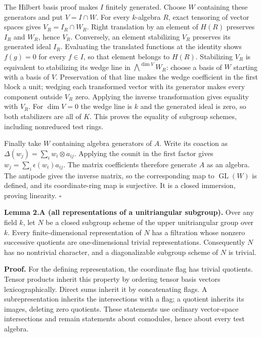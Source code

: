 \documentclass[11pt,a4paper,openany]{report}
\begin{document}
The Hilbert basis proof makes \(I\) finitely generated. Choose \(W\) containing these generators and put \(V=I\cap W\). For every \(k\)-algebra \(R\), exact tensoring of vector spaces gives \(V_R=I_R\cap W_R\). Right translation by an element of \(H(R)\) preserves \(I_R\) and \(W_R\), hence \(V_R\). Conversely, an element stabilizing \(V_R\) preserves its generated ideal \(I_R\). Evaluating the translated functions at the identity shows \(f(g)=0\) for every \(f\in I\), so that element belongs to \(H(R)\). Stabilizing \(V_R\) is equivalent to stabilizing its wedge line in \(\bigwedge^{\dim V}W_R\): choose a basis of \(W\) starting with a basis of \(V\). Preservation of that line makes the wedge coefficient in the first block a unit; wedging each transformed vector with its generator makes every component outside \(V_R\) zero. Applying the inverse transformation gives equality with \(V_R\). For \(\dim V=0\) the wedge line is \(k\) and the generated ideal is zero, so both stabilizers are all of \(K\). This proves the equality of subgroup schemes, including nonreduced test rings.

Finally take \(W\) containing algebra generators of \(A\). Write its coaction as \(\Delta(w_j)=\sum_i w_i\otimes a_{ij}\). Applying the counit in the first factor gives \(w_j=\sum_i\epsilon(w_i)a_{ij}\). The matrix coefficients therefore generate \(A\) as an algebra. The antipode gives the inverse matrix, so the corresponding map to \(\operatorname{GL}(W)\) is defined, and its coordinate-ring map is surjective. It is a closed immersion, proving linearity. \(\square\)

\textbf{Lemma 2.A (all representations of a unitriangular subgroup).} Over any field \(k\), let \(N\) be a closed subgroup scheme of the upper unitriangular group over \(k\). Every finite-dimensional representation of \(N\) has a filtration whose nonzero successive quotients are one-dimensional trivial representations. Consequently \(N\) has no nontrivial character, and a diagonalizable subgroup scheme of \(N\) is trivial.

\textbf{Proof.} For the defining representation, the coordinate flag has trivial quotients. Tensor products inherit this property by ordering tensor basis vectors lexicographically. Direct sums inherit it by concatenating flags. A subrepresentation inherits the intersections with a flag; a quotient inherits its images, deleting zero quotients. These statements use ordinary vector-space intersections and remain statements about comodules, hence about every test algebra.
\end{document}

